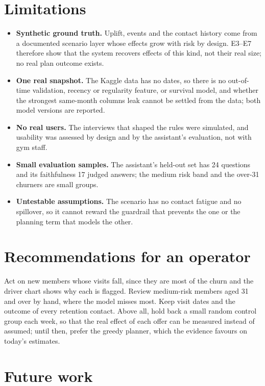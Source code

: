 \section{Limitations}

\begin{itemize}
  \item \textbf{Synthetic ground truth.} Uplift, events and the contact history come from a documented scenario layer whose effects grow with risk by design. E3--E7 therefore show that the system recovers effects of this kind, not their real size; no real plan outcome exists.
  \item \textbf{One real snapshot.} The Kaggle data has no dates, so there is no out-of-time validation, recency or regularity feature, or survival model, and whether the strongest same-month columns leak cannot be settled from the data; both model versions are reported.
  \item \textbf{No real users.} The interviews that shaped the rules were simulated, and usability was assessed by design and by the assistant's evaluation, not with gym staff.
  \item \textbf{Small evaluation samples.} The assistant's held-out set has 24 questions and its faithfulness 17 judged answers; the medium risk band and the over-31 churners are small groups.
  \item \textbf{Untestable assumptions.} The scenario has no contact fatigue and no spillover, so it cannot reward the guardrail that prevents the one or the planning term that models the other.
\end{itemize}

\section{Recommendations for an operator}

Act on new members whose visits fall, since they are most of the churn and the driver chart shows why each is flagged. Review medium-risk members aged 31 and over by hand, where the model misses most. Keep visit dates and the outcome of every retention contact. Above all, hold back a small random control group each week, so that the real effect of each offer can be measured instead of assumed; until then, prefer the greedy planner, which the evidence favours on today's estimates.

\section{Future work}

